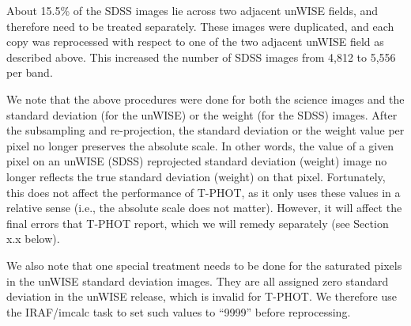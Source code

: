 \documentclass[numberedappendix,apj,twocolumn]{emulateapj}
\begin{document}
About 15.5\% of the SDSS images lie across two adjacent unWISE fields, and therefore need to be treated separately.  These images were duplicated, and each copy was reprocessed with respect to one of the two adjacent unWISE field as described above. This increased the number of SDSS images from 4,812 to 5,556 per band.

    We note that the above procedures were done for both the science images and the standard deviation (for the unWISE) or the weight (for the SDSS) images. After the subsampling and re-projection, the standard deviation or the weight value per pixel no longer preserves the absolute scale. In other words, the value of a given pixel on an unWISE (SDSS) reprojected standard deviation (weight) image no longer reflects the true standard deviation (weight) on that pixel. Fortunately, this does not affect the performance of T-PHOT, as it only uses these values in a relative sense (i.e., the absolute scale does not matter). However, it will affect the final errors that T-PHOT report, which we will remedy separately (see Section x.x below).

    We also note that one special treatment needs to be done for the saturated pixels in the unWISE standard deviation images. They are all assigned zero standard deviation  in the unWISE release, which is invalid for T-PHOT. We therefore use the IRAF/imcalc task to set such values to “9999” before reprocessing.
    



\end{document}
